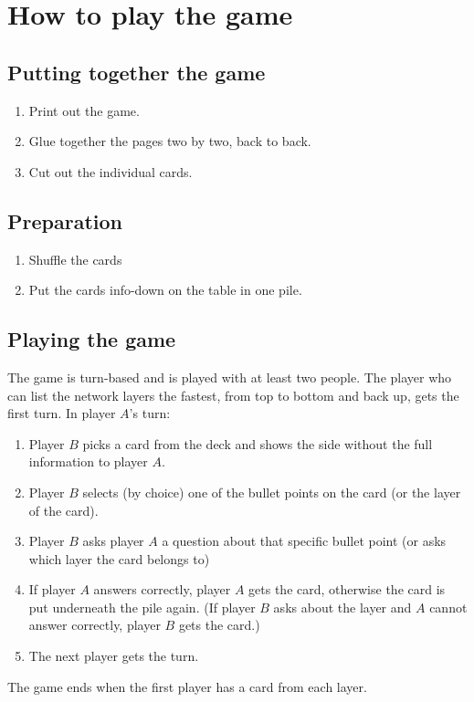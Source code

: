 \documentclass[main.tex]{subfiles}
\begin{document}
\section*{How to play the game}


\subsection*{Putting together the game}
\begin{enumerate}
\item Print out the game.
\item Glue together the pages two by two, back to back.
\item Cut out the individual cards.
\end{enumerate}

\subsection*{Preparation}
\begin{enumerate}
\item Shuffle the cards
\item Put the cards info-down on the table in one pile.
\end{enumerate}

\subsection*{Playing the game}
The game is turn-based and is played with at least two people.
The player who can list the network layers the fastest, from top to bottom and back up, gets the first turn.
In player $A$'s turn:
\begin{enumerate}
\item Player $B$ picks a card from the deck and shows the side without the full information to player $A$.
\item Player $B$ selects (by choice) one of the bullet points on the card (or the layer of the card).
\item Player $B$ asks player $A$ a question about that specific bullet point (or asks which layer the card belongs to)
\item If player $A$ answers correctly, player $A$ gets the card, otherwise the card is put underneath the pile again. (If player $B$ asks about the layer and $A$ cannot answer correctly, player $B$ gets the card.)
\item The next player gets the turn. 
\end{enumerate}
The game ends when the first player has a card from each layer.
\end{document}
